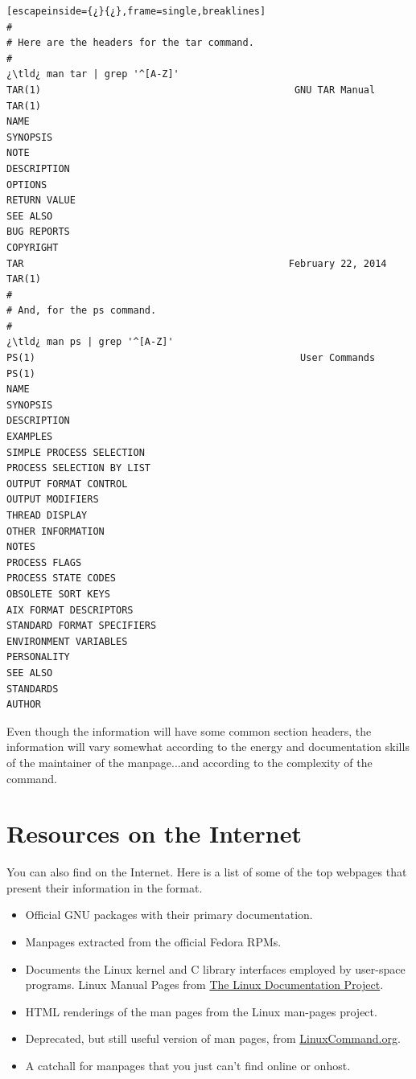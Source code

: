 \begin{lstlisting}[escapeinside={¿}{¿},frame=single,breaklines]
#
# Here are the headers for the tar command.
#
¿\tld¿ man tar | grep '^[A-Z]'
TAR(1)                                            GNU TAR Manual                                            TAR(1)
NAME
SYNOPSIS
NOTE
DESCRIPTION
OPTIONS
RETURN VALUE
SEE ALSO
BUG REPORTS
COPYRIGHT
TAR                                              February 22, 2014                                          TAR(1)
#
# And, for the ps command.
#
¿\tld¿ man ps | grep '^[A-Z]'
PS(1)                                              User Commands                                             PS(1)
NAME
SYNOPSIS
DESCRIPTION
EXAMPLES
SIMPLE PROCESS SELECTION
PROCESS SELECTION BY LIST
OUTPUT FORMAT CONTROL
OUTPUT MODIFIERS
THREAD DISPLAY
OTHER INFORMATION
NOTES
PROCESS FLAGS
PROCESS STATE CODES
OBSOLETE SORT KEYS
AIX FORMAT DESCRIPTORS
STANDARD FORMAT SPECIFIERS
ENVIRONMENT VARIABLES
PERSONALITY
SEE ALSO
STANDARDS
AUTHOR
\end{lstlisting}

Even though the information will have some common section headers, the information will vary somewhat according to the energy and documentation skills of the maintainer of the manpage...and according to the complexity of the command.\\

\section{Resources on the Internet}

You can also find  on the Internet. Here is a list of some of the top webpages that present their information in the  format.

\begin{itemize}
	\item {}Official GNU packages with their primary documentation.
	\item {}Manpages extracted from the official Fedora RPMs.
	\item {}Documents the Linux kernel and C library interfaces employed by user-space programs. Linux Manual Pages from \href{http://www.tldp.org/manpages/man.html}{The Linux Documentation Project}.
	\item {}HTML renderings of the man pages from the Linux man-pages project.
	\item {} Deprecated, but still useful version of man pages, from \href{http://linuxcommand.org/}{LinuxCommand.org}.
	\item {}  A catchall for manpages that you just can't find online or onhost.	
\end{itemize}

